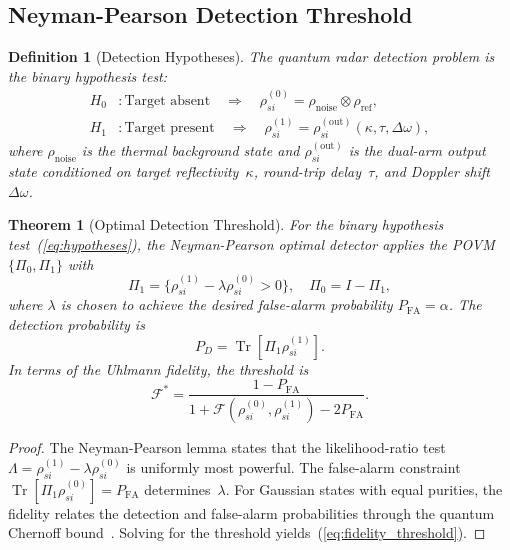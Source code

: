 \documentclass[journal]{IEEEtran}
\newtheorem{theorem}{Theorem}
\newtheorem{definition}{Definition}
\DeclareMathOperator{\Tr}{Tr}
\begin{document}
\subsection{Neyman-Pearson Detection Threshold}

\begin{definition}[Detection Hypotheses]\label{def:hypotheses}
The quantum radar detection problem is the binary hypothesis test:
\begin{equation}\label{eq:hypotheses}
\begin{aligned}
H_0 &: \text{Target absent} \quad \Rightarrow \quad \rho_{si}^{(0)} = \rho_{\text{noise}} \otimes \rho_{\text{ref}}, \\
H_1 &: \text{Target present} \quad \Rightarrow \quad \rho_{si}^{(1)} = \rho_{si}^{(\text{out})}(\kappa, \tau, \Delta\omega),
\end{aligned}
\end{equation}
where $\rho_{\text{noise}}$ is the thermal background state and $\rho_{si}^{(\text{out})}$ is the dual-arm output state conditioned on target reflectivity~$\kappa$, round-trip delay~$\tau$, and Doppler shift~$\Delta\omega$.
\end{definition}

\begin{theorem}[Optimal Detection Threshold]\label{thm:threshold}
For the binary hypothesis test~(\ref{eq:hypotheses}), the Neyman-Pearson optimal detector applies the POVM $\{\Pi_0, \Pi_1\}$ with
\begin{equation}\label{eq:np_povm}
\Pi_1 = \{\rho_{si}^{(1)} - \lambda\rho_{si}^{(0)} > 0\}, \quad \Pi_0 = I - \Pi_1,
\end{equation}
where $\lambda$ is chosen to achieve the desired false-alarm probability $P_{\text{FA}} = \alpha$. The detection probability is
\begin{equation}\label{eq:detection_prob}
P_D = \Tr[\Pi_1 \rho_{si}^{(1)}].
\end{equation}
In terms of the Uhlmann fidelity, the threshold is
\begin{equation}\label{eq:fidelity_threshold}
\mathcal{F}^{*} = \frac{1 - P_{\text{FA}}}{1 + \mathcal{F}(\rho_{si}^{(0)}, \rho_{si}^{(1)}) - 2P_{\text{FA}}}.
\end{equation}
\end{theorem}

\begin{proof}
The Neyman-Pearson lemma states that the likelihood-ratio test $\Lambda = \rho_{si}^{(1)} - \lambda\rho_{si}^{(0)}$ is uniformly most powerful. The false-alarm constraint $\Tr[\Pi_1\rho_{si}^{(0)}] = P_{\text{FA}}$ determines~$\lambda$. For Gaussian states with equal purities, the fidelity relates the detection and false-alarm probabilities through the quantum Chernoff bound~\cite{audenaert2007discriminating}. Solving for the threshold yields~(\ref{eq:fidelity_threshold}).
\end{proof}
\end{document}
